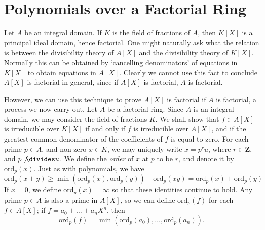 \section{Polynomials over a Factorial Ring}

Let $A$ be an integral domain. If $K$ is the field of fractions of $A$, then $K[X]$ is a principal ideal domain, hence factorial. One might naturally ask what the relation is between the divisibility theory of $A[X]$ and the divisibility theory of $K[X]$. Normally this can be obtained by `cancelling denominators' of equations in $K[X]$ to obtain equations in $A[X]$. Clearly we cannot use this fact to conclude $A[X]$ is factorial in general, since if $A[X]$ is factorial, $A$ is factorial.

However, we can use this technique to prove $A[X]$ is factorial if $A$ is factorial, a process we now carry out. Let $A$ be a factorial ring. Since $A$ is an integral domain, we may consider the field of fractions $K$. We shall show that $f \in A[X]$ is irreducible over $K[X]$ if and only if $f$ is irreducible over $A[X]$, and if the greatest common denominator of the coefficients of $f$ is equal to zero. For each prime $p \in A$, and non-zero $x \in K$, we may uniquely write $x = p^r u$, where $r \in \mathbf{Z}$, and $p \not \divides u$. We define the {\it order} of $x$ at $p$ to be $r$, and denote it by $\text{ord}_p(x)$. Just as with polynomials, we have
%
\[ \text{ord}_p(x + y) \geq \min \left( \text{ord}_p(x),  \text{ord}_p(y) \right)\ \ \ \ \ \text{ord}_p(xy) = \text{ord}_p(x) + \text{ord}_p(y) \]
%
If $x = 0$, we define $\text{ord}_p(x) = \infty$ so that these identities continue to hold. Any prime $p \in A$ is also a prime in $A[X]$, so we can define $\text{ord}_p(f)$ for each $f \in A[X]$; if $f = a_0 + \dots + a_n X^n$, then
%
\[ \text{ord}_p(f) = \min \left( \text{ord}_p(a_0), \dots, \text{ord}_p(a_n) \right). \]
%
